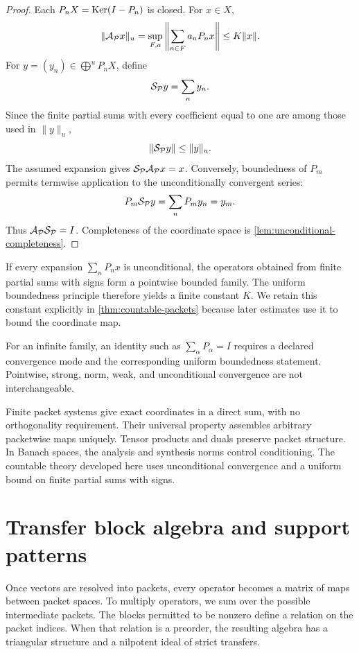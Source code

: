 \begin{proof}
Each $P_nX=\operatorname{Ker}(I-P_n)$ is closed.  For $x\in X$,
\[
\|\mathcal A_{\mathcal P}x\|_u
=
\sup_{F,a}
\left\|\sum_{n\in F}a_nP_nx\right\|
\leq K\|x\|.
\]
For $y=(y_n)\in\bigoplus^uP_nX$, define
\[
\mathcal S_{\mathcal P}y=\sum_ny_n.
\]
Since the finite partial sums with every coefficient equal to one are among those used in $\|y\|_u$,
\[
\|\mathcal S_{\mathcal P}y\|
\leq\|y\|_u.
\]
The assumed expansion gives $\mathcal S_{\mathcal P}\mathcal A_{\mathcal P}x=x$.  Conversely, boundedness of $P_m$ permits termwise application to the unconditionally convergent series:
\[
P_m\mathcal S_{\mathcal P}y
=
\sum_nP_my_n
=y_m.
\]
Thus $\mathcal A_{\mathcal P}\mathcal S_{\mathcal P}=I$.  Completeness of the coordinate space is \cref{lem:unconditional-completeness}.
\end{proof}

\begin{remark}
\label{rem:uniform-boundedness}
If every expansion $\sum_nP_nx$ is unconditional, the operators obtained from finite partial sums with signs form a pointwise bounded family.  The uniform boundedness principle therefore yields a finite constant $K$.  We retain this constant explicitly in \cref{thm:countable-packets} because later estimates use it to bound the coordinate map.
\end{remark}

\begin{boundary}
\label{bnd:infinite-packet-topology}
For an infinite family, an identity such as $\sum_\alpha P_\alpha=I$ requires a declared convergence mode and the corresponding uniform boundedness statement.  Pointwise, strong, norm, weak, and unconditional convergence are not interchangeable.
\end{boundary}

\begin{sectionrecap}
Finite packet systems give exact coordinates in a direct sum, with no orthogonality requirement.  Their universal property assembles arbitrary packetwise maps uniquely.  Tensor products and duals preserve packet structure.  In Banach spaces, the analysis and synthesis norms control conditioning.  The countable theory developed here uses unconditional convergence and a uniform bound on finite partial sums with signs.
\end{sectionrecap}


\section{Transfer block algebra and support patterns}
\begin{readerroadmap}
Once vectors are resolved into packets, every operator becomes a matrix of maps between packet spaces.  To multiply operators, we sum over the possible intermediate packets.  The blocks permitted to be nonzero define a relation on the packet indices.  When that relation is a preorder, the resulting algebra has a triangular structure and a nilpotent ideal of strict transfers.
\end{readerroadmap}
